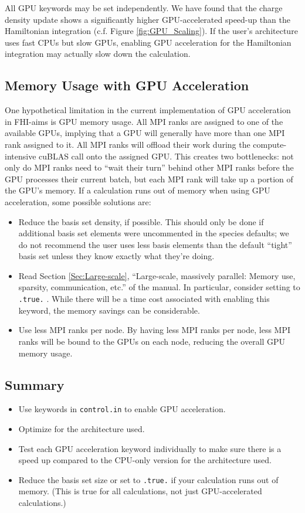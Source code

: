 All GPU keywords may be set independently. We have found that the charge density update shows a significantly higher GPU-accelerated speed-up than the Hamiltonian integration (c.f. Figure \ref{fig:GPU_Scaling}). If the user's architecture uses fast CPUs but slow GPUs, enabling GPU acceleration for the Hamiltonian integration may actually slow down the calculation.

\subsection{Memory Usage with GPU Acceleration}

One hypothetical limitation in the current implementation of GPU acceleration in FHI-aims is GPU memory usage. All MPI ranks are assigned to one of the available GPUs, implying that a GPU will generally have more than one MPI rank assigned to it. All MPI ranks will offload their work during the compute-intensive cuBLAS call onto the assigned GPU. This creates two bottlenecks: not only do MPI ranks need to ``wait their turn'' behind other MPI ranks before the GPU processes their current batch, but each MPI rank will take up a portion of the GPU's memory. If a calculation runs out of memory when using GPU acceleration, some possible solutions are:
\begin{itemize}
\item Reduce the basis set density, if possible. This should only be done if additional basis set elements were uncommented in the species defaults; we do not recommend the user uses less basis elements than the default ``tight'' basis set unless they know exactly what they're doing.
\item Read Section \ref{Sec:Large-scale}, ``Large-scale, massively parallel: Memory use, sparsity, communication, etc.'' of the manual. In particular, consider setting  to \texttt{.true.} . While there will be a time cost associated with enabling this keyword, the memory savings can be considerable.
\item Use less MPI ranks per node. By having less MPI ranks per node, less MPI ranks will be bound to the GPUs on each node, reducing the overall GPU memory usage.
\end{itemize}

\subsection*{Summary}
\begin{itemize}
\item Use keywords in \texttt{control.in} to enable GPU acceleration. \item Optimize  for the architecture used.
\item Test each GPU acceleration keyword individually to make sure there is a speed up compared to the CPU-only version for the architecture used.
\item Reduce the basis set size or set  to \texttt{.true.} if your calculation runs out of memory. (This is true for all calculations, not just GPU-accelerated calculations.)
\end{itemize}
